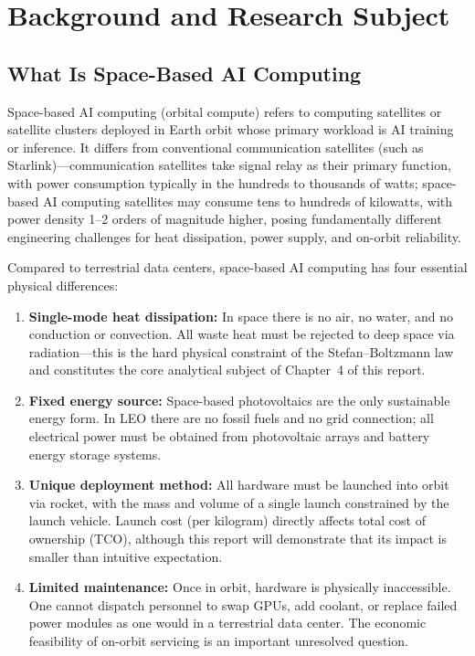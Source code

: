 
\section{Background and Research Subject}

\subsection{What Is Space-Based AI Computing}

Space-based AI computing (orbital compute) refers to computing satellites or satellite clusters deployed in Earth orbit whose primary workload is AI training or inference. It differs from conventional communication satellites (such as Starlink)---communication satellites take signal relay as their primary function, with power consumption typically in the hundreds to thousands of watts; space-based AI computing satellites may consume tens to hundreds of kilowatts, with power density 1--2 orders of magnitude higher, posing fundamentally different engineering challenges for heat dissipation, power supply, and on-orbit reliability.

Compared to terrestrial data centers, space-based AI computing has four essential physical differences:

\begin{enumerate}[leftmargin=*]
    \item \textbf{Single-mode heat dissipation:} In space there is no air, no water, and no conduction or convection. All waste heat must be rejected to deep space via radiation---this is the hard physical constraint of the Stefan--Boltzmann law and constitutes the core analytical subject of Chapter~4 of this report.
    \item \textbf{Fixed energy source:} Space-based photovoltaics are the only sustainable energy form. In LEO there are no fossil fuels and no grid connection; all electrical power must be obtained from photovoltaic arrays and battery energy storage systems.
    \item \textbf{Unique deployment method:} All hardware must be launched into orbit via rocket, with the mass and volume of a single launch constrained by the launch vehicle. Launch cost (per kilogram) directly affects total cost of ownership (TCO), although this report will demonstrate that its impact is smaller than intuitive expectation.
    \item \textbf{Limited maintenance:} Once in orbit, hardware is physically inaccessible. One cannot dispatch personnel to swap GPUs, add coolant, or replace failed power modules as one would in a terrestrial data center. The economic feasibility of on-orbit servicing is an important unresolved question.
\end{enumerate}

